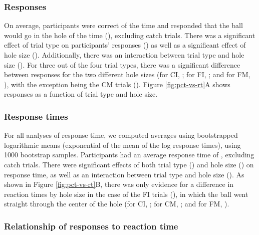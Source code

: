 \documentclass[10pt,letterpaper]{article}
\begin{document}
\subsubsection{Responses}

On average, participants were correct \AvgCorrect{} of the time and responded that the ball would go in the hole \AvgResponse{} of the time (\ResponseN{}), excluding catch trials.
There was a significant effect of trial type on participants' responses (\ResponseHoleClass{}) as well as a significant effect of hole size (\ResponseHoleSize{}).
Additionally, there was an interaction between trial type and hole size (\ResponseFull{}).
For three out of the four trial types, there was a significant difference between responses for the two different hole sizes (for CI, \ResponseCIttest{}; for FI, \ResponseCIttest{}; and for FM, \ResponseFMttest{}), with the exception being the CM trials (\ResponseCMttest{}).
Figure \ref{fig:pct-vs-rt}A shows responses as a function of trial type and hole size.

\subsubsection{Response times}

For all analyses of response time, we computed averages using bootstrapped logarithmic means (exponential of the mean of the log response times), using 1000 bootstrap samples.
Participants had an average response time of \AvgRT{}, excluding catch trials.
There were significant effects of both trial type (\RTHoleClass{}) and hole size (\RTHoleSize{}) on response time, as well as an interaction between trial type and hole size (\RTFull{}).
As shown in Figure \ref{fig:pct-vs-rt}B, there was only evidence for a difference in reaction times by hole size in the case of the FI trials (\ResponsetimeFIttest{}), in which the ball went straight through the center of the hole (for CI, \ResponsetimeCIttest{}; for CM, \ResponsetimeCMttest{}; and for FM, \ResponsetimeFMttest{}).

\subsubsection{Relationship of responses to reaction time}
\end{document}

